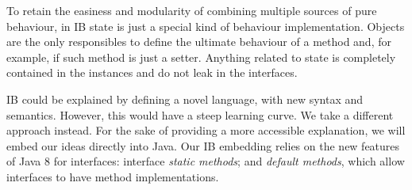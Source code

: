 To retain the easiness and modularity of combining multiple sources of
pure behaviour, in IB state is just a special kind of behaviour
implementation. Objects are the only responsibles to define the
ultimate behaviour of a method and, for example, if such method is
just a setter. Anything related to state is completely contained in
the instances and do not leak in the interfaces.


IB could be explained by defining a novel language, with new syntax
and semantics. However, this would have a steep learning curve.  We
take a different approach instead. For the sake of providing a more
accessible explanation, we will embed our ideas directly into Java. 
Our IB embedding relies on the
new features of Java 8 for interfaces: interface \emph{static methods}; and
\emph{default methods}, which allow interfaces to have method
implementations. 


%
%
%
%

